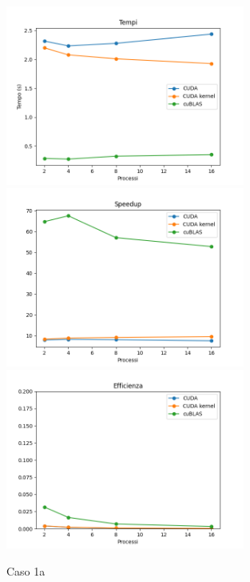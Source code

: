 \begin{figure}[h]
    \centering
    \includegraphics[width=0.7\textwidth]{./imgs/graphs/caso_a1.png}
    \includegraphics[width=0.7\textwidth]{./imgs/graphs/caso_a1_speedup.png}
    \includegraphics[width=0.7\textwidth]{./imgs/graphs/caso_a1_efficiency.png}
    \caption{Caso 1a}
\end{figure}

